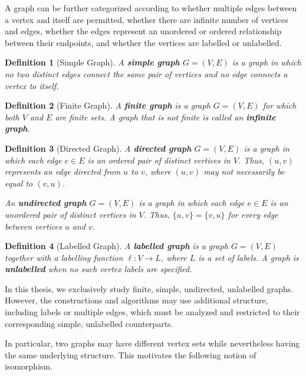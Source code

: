 \documentclass[11pt]{report}
\newtheorem{definition}{Definition}[section]
\begin{document}
A graph can be further categorized according to whether multiple edges between a vertex and itself are permitted, whether there are infinite number of vertices and edges, whether the edges represent an unordered or ordered relationship between their endpoints, and whether the vertices are labelled or unlabelled. 

\begin{definition}[Simple Graph] \label{def::simple_graph}
  A \textbf{simple graph} $G=(V,E)$ is a graph in which no two distinct edges connect the same pair of vertices and no edge connects a vertex to itself. 
\end{definition}

\begin{definition}[Finite Graph] \label{def::finite_graph}
  A \textbf{finite graph} is a graph $G=(V,E)$ for which both $V$ and $E$ are finite sets. A graph that is not finite is called an \textbf{infinite graph}.
\end{definition}

\begin{definition}[Directed Graph] \label{def::directed_graph}
  A \textbf{directed graph} $G=(V,E)$ is a graph in which each edge $e\in E$ is an ordered pair of distinct vertices in $V$. Thus, $(u,v)$ represents an edge directed from $u$ to $v$, where 
  $(u,v)$ may not necessarily be equal to $(v,u)$.

  An \textbf{undirected graph} $G=(V,E)$ is a graph in which each edge $e\in E$ is an unordered pair of distinct vertices in $V$. Thus, $\{u,v\}=\{v,u\}$ for every edge between vertices $u$ and $v$.
\end{definition}

\begin{definition}[Labelled Graph] \label{def::labelled_graph}
  A \textbf{labelled graph} is a graph $G=(V,E)$ together with a labelling function $\ell:V\rightarrow L$, where $L$ is a set of labels. A graph is \textbf{unlabelled} when no such vertex labels are specified. 
\end{definition}

In this thesis, we exclusively study finite, simple, undirected, unlabelled graphs. However, the constructions and algorithms may use additional structure, including labels or multiple edges, which must be analyzed and restricted to their corresponding simple, unlabelled counterparts.

In particular, two graphs may have different vertex sets while nevertheless having the same underlying structure. This motivates the following notion of isomorphism.
\end{document}
